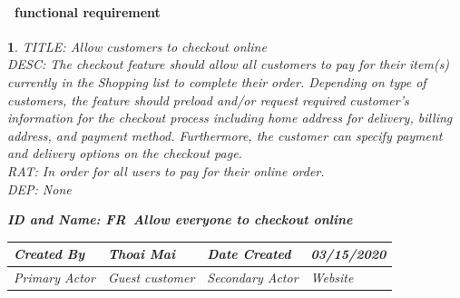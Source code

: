 \documentclass{scrreprt}
\theoremstyle{funreq}
\newtheorem{funreq}{}
\begin{document}
	\paragraph[]{\Subsectionname ~functional requirement }
	\begin{funreq}
		\label{online_checkout}
		TITLE: Allow customers to checkout online\\
		DESC: The checkout feature should allow all customers to pay for their item(s) currently in the Shopping list to complete their order. Depending on type of customers, the feature should preload and/or request required customer’s information for the checkout process including home address for delivery, billing address, and payment method. Furthermore, the customer can specify payment and delivery options on the checkout page.\\
		RAT: In order for all users to pay for their online order.\\
		DEP: None\\
		
		\begin{table}[H]
			\begin{flushleft}\bfseries{ID and Name: FR\thefunreq ~\hspace{.6cm}Allow everyone to checkout online}\end{flushleft}
			\begin{tabularx}{\columnwidth}{|X|X|X|X|}
				\hline
				Created By    & Thoai Mai & Date Created    & 03/15/2020 \\ \hline
				Primary Actor & Guest customer        & Secondary Actor & Website \\ \hline
			\end{tabularx}
		
\end{table}
\end{funreq}
\end{document}
